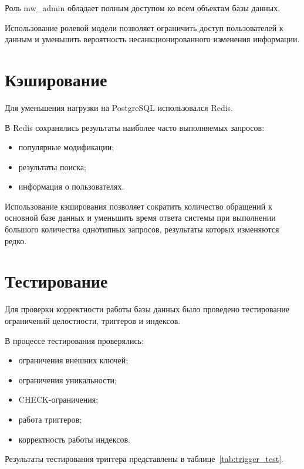 Роль mw\_admin обладает полным доступом ко всем объектам базы данных.

Использование ролевой модели позволяет ограничить доступ пользователей
к данным и уменьшить вероятность несанкционированного изменения
информации.

\section{Кэширование}

Для уменьшения нагрузки на PostgreSQL использовался Redis.

В Redis сохранялись результаты наиболее часто выполняемых запросов:

\begin{itemize}
	\item популярные модификации;
	\item результаты поиска;
	\item информация о пользователях.
\end{itemize}

Использование кэширования позволяет сократить количество обращений к
основной базе данных и уменьшить время ответа системы при выполнении большого количества
однотипных запросов, результаты которых изменяются редко.

\section{Тестирование}

Для проверки корректности работы базы данных было проведено
тестирование ограничений целостности, триггеров и индексов.

В процессе тестирования проверялись:

\begin{itemize}
	\item ограничения внешних ключей;
	\item ограничения уникальности;
	\item CHECK-ограничения;
	\item работа триггеров;
	\item корректность работы индексов.
\end{itemize}

Результаты тестирования триггера представлены в
таблице~\ref{tab:trigger_test}.

